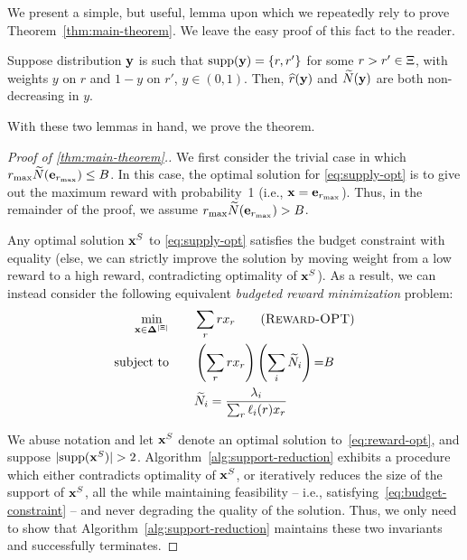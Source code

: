 \documentclass[12pt]{article}
\begin{document}
{We present a simple, but useful, lemma upon which we repeatedly rely to prove Theorem~\ref{thm:main-theorem}. We leave the easy proof of this fact to the reader.}

\begin{lemma}\label{lem:obvious-fact}
Suppose distribution $\mathbf{y}$ is such that $\text{supp}(\mathbf{y}) = \left\{r, r'\right\}$ for some $r > r' \in \Xi$, with weights $y$ on $r$ and $1-y$ on $r'$, $y \in (0,1)$. Then, $\widehat{r}(\mathbf{y})$ and $\widetilde{N}(\mathbf{y})$ are {both} non-decreasing in $y$. 
\end{lemma}

With these two lemmas in hand, we prove the theorem.

\begin{proof}[Proof of \cref{thm:main-theorem}.]
We first consider the trivial case in which $r_{\max}\widetilde{N}(\mathbf{e}_{r_{\max}}) \leq B$. In this case, {the optimal solution for \ref{eq:supply-opt} is} to give out the maximum reward with probability~1 (i.e., $\mathbf{x} = \mathbf{e}_{r_{\max}}$). %
Thus, in the remainder of the proof, we assume $r_{\max}\widetilde{N}(\mathbf{e}_{r_{\max}}) > B$.

Any optimal solution $\mathbf{x}^S$ to \ref{eq:supply-opt} satisfies the budget constraint with equality (else, we can strictly improve the solution by moving weight from a low reward to a high reward, contradicting optimality of $\mathbf{x}^S$). As a result, we can instead consider the following equivalent {\it budgeted reward minimization} problem:
\begin{align}
    \min_{{\xvec \in \simplex^{|\rewardset|}}} \qquad &\sum_r rx_r \tag{\textsc{Reward-OPT}} \label{eq:reward-opt} \\
    \text{subject to} \qquad &\left(\sum_r r x_r\right)\left(\sum_i \fluidn_i\right) {=} B \label{eq:budget-constraint}\\
    & \fluidn_i=\frac{\lambda_i}{\sum_r \ell_i(r) x_r}\notag 
\end{align}

We abuse notation and let $\mathbf{x}^S$ denote an optimal solution to~\ref{eq:reward-opt}, and suppose $|\text{supp}(\mathbf{x}^S)| > 2$. Algorithm~\ref{alg:support-reduction} exhibits a procedure which either contradicts optimality of $\mathbf{x}^S$, or iteratively reduces the size of the support of $\mathbf{x}^S$, all the while maintaining feasibility  -- i.e., satisfying~\eqref{eq:budget-constraint} -- and never degrading the quality of the solution. Thus, {we only need to show} %
that Algorithm~\ref{alg:support-reduction} maintains these two invariants and successfully terminates.



\end{proof}
\end{document}
